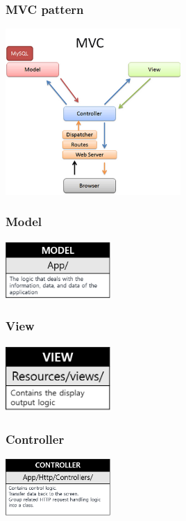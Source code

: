 \documentclass[letterpaper, 10 pt, conference]{ieeeconf}  %
\begin{document}
\subsubsection{MVC pattern}
\begin{center}
\includegraphics[width = 0.5\textwidth]{Architecture/MVC_structure.png}


\subsubsection{Model\\}
\includegraphics[width = 0.3\textwidth]{Architecture/Model.png}
\subsubsection{View\\}
\includegraphics[width = 0.3\textwidth]{Architecture/View.png}
\subsubsection{Controller\\}
\includegraphics[width = 0.3\textwidth]{Architecture/Controller.png}

\end{center}
\end{document}
